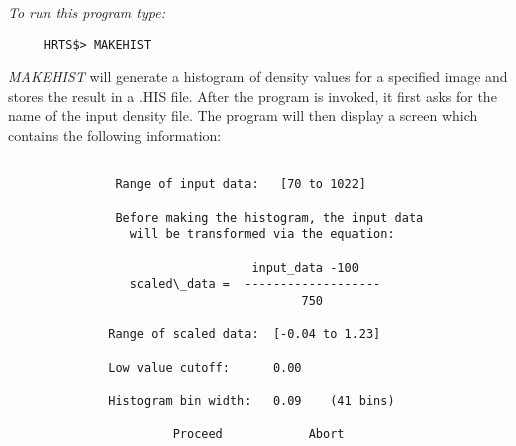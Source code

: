 {\em To run this program type:}
\begin{verbatim}   
     HRTS$> MAKEHIST                    
\end{verbatim}
{\em MAKEHIST} will generate a histogram of density values for a specified
   image and stores the result in a .HIS file.  After the program is
   invoked, it first asks for the name of the input density file.  The
   program will then display a screen which contains the following
   information:
\begin{center}
\begin{verbatim}   
            
               Range of input data:   [70 to 1022]           
                                                             
               Before making the histogram, the input data   
                 will be transformed via the equation:      
                                                            
                                  input_data -100           
                 scaled\_data =  -------------------         
                                         750                
                                                            
              Range of scaled data:  [-0.04 to 1.23]        
                                                            
              Low value cutoff:      0.00                   
                                                            
              Histogram bin width:   0.09    (41 bins)      
                                                            
                       Proceed            Abort             
                                                            

\end{verbatim}
\end{center}   


